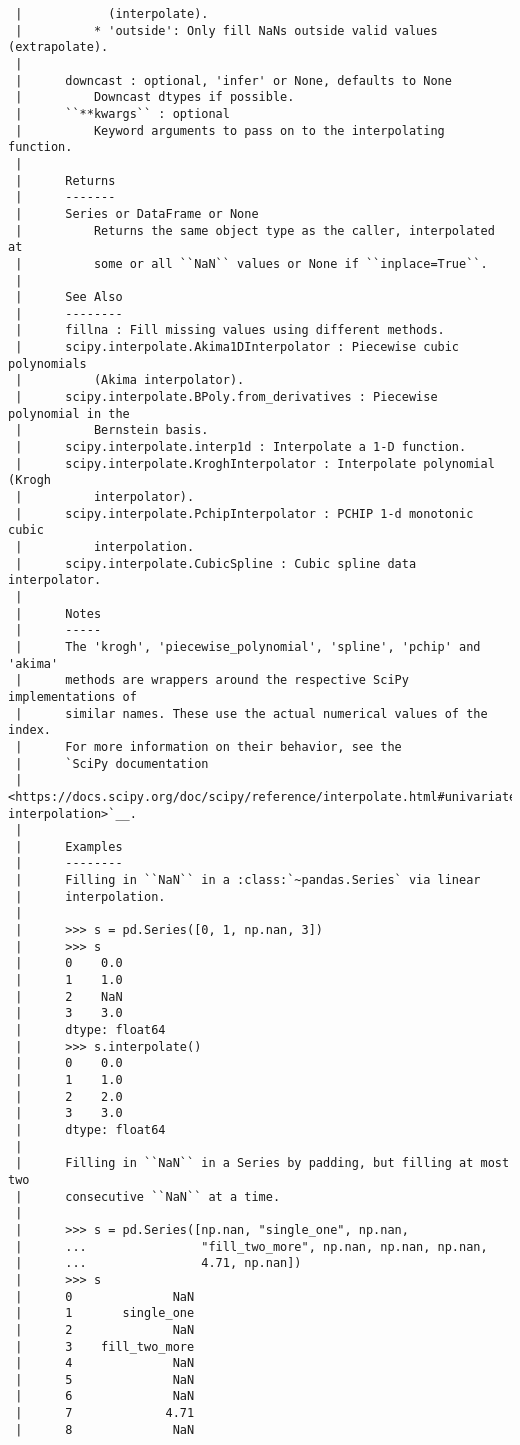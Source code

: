 \documentclass[
  letterpaper,
  DIV=11,
  numbers=noendperiod]{scrreprt}
\begin{document}
\begin{verbatim}
 |            (interpolate).
 |          * 'outside': Only fill NaNs outside valid values (extrapolate).
 |      
 |      downcast : optional, 'infer' or None, defaults to None
 |          Downcast dtypes if possible.
 |      ``**kwargs`` : optional
 |          Keyword arguments to pass on to the interpolating function.
 |      
 |      Returns
 |      -------
 |      Series or DataFrame or None
 |          Returns the same object type as the caller, interpolated at
 |          some or all ``NaN`` values or None if ``inplace=True``.
 |      
 |      See Also
 |      --------
 |      fillna : Fill missing values using different methods.
 |      scipy.interpolate.Akima1DInterpolator : Piecewise cubic polynomials
 |          (Akima interpolator).
 |      scipy.interpolate.BPoly.from_derivatives : Piecewise polynomial in the
 |          Bernstein basis.
 |      scipy.interpolate.interp1d : Interpolate a 1-D function.
 |      scipy.interpolate.KroghInterpolator : Interpolate polynomial (Krogh
 |          interpolator).
 |      scipy.interpolate.PchipInterpolator : PCHIP 1-d monotonic cubic
 |          interpolation.
 |      scipy.interpolate.CubicSpline : Cubic spline data interpolator.
 |      
 |      Notes
 |      -----
 |      The 'krogh', 'piecewise_polynomial', 'spline', 'pchip' and 'akima'
 |      methods are wrappers around the respective SciPy implementations of
 |      similar names. These use the actual numerical values of the index.
 |      For more information on their behavior, see the
 |      `SciPy documentation
 |      <https://docs.scipy.org/doc/scipy/reference/interpolate.html#univariate-interpolation>`__.
 |      
 |      Examples
 |      --------
 |      Filling in ``NaN`` in a :class:`~pandas.Series` via linear
 |      interpolation.
 |      
 |      >>> s = pd.Series([0, 1, np.nan, 3])
 |      >>> s
 |      0    0.0
 |      1    1.0
 |      2    NaN
 |      3    3.0
 |      dtype: float64
 |      >>> s.interpolate()
 |      0    0.0
 |      1    1.0
 |      2    2.0
 |      3    3.0
 |      dtype: float64
 |      
 |      Filling in ``NaN`` in a Series by padding, but filling at most two
 |      consecutive ``NaN`` at a time.
 |      
 |      >>> s = pd.Series([np.nan, "single_one", np.nan,
 |      ...                "fill_two_more", np.nan, np.nan, np.nan,
 |      ...                4.71, np.nan])
 |      >>> s
 |      0              NaN
 |      1       single_one
 |      2              NaN
 |      3    fill_two_more
 |      4              NaN
 |      5              NaN
 |      6              NaN
 |      7             4.71
 |      8              NaN

\end{verbatim}
\end{document}
